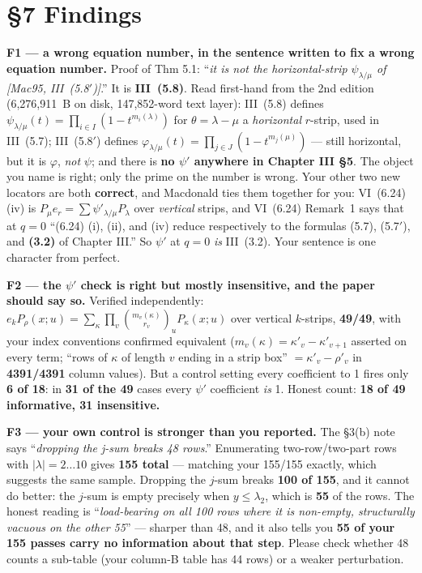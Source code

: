 \documentclass[11pt]{article}
\begin{document}
\section*{\S7 Findings}
\textbf{F1 --- a wrong equation number, in the sentence written to fix a wrong equation
number.} Proof of Thm 5.1: ``\emph{it is not the horizontal-strip $\psi_{\lambda/\mu}$ of
[Mac95, III~(5.8$'$)]}.'' It is \textbf{III~(5.8)}. Read first-hand from the 2nd edition
(6{,}276{,}911~B on disk, 147{,}852-word text layer): III~(5.8) defines
$\psi_{\lambda/\mu}(t)=\prod_{i\in I}(1-t^{m_i(\lambda)})$ for $\theta=\lambda-\mu$ a
\emph{horizontal} $r$-strip, used in III~(5.7); III~(5.8$'$) defines
$\varphi_{\lambda/\mu}(t)=\prod_{j\in J}(1-t^{m_j(\mu)})$ --- still horizontal, but it is
$\varphi$, \emph{not} $\psi$; and there is \textbf{no $\psi'$ anywhere in Chapter III
\S5}. The object you name is right; only the prime on the number is wrong. Your other
two new locators are both \textbf{correct}, and Macdonald ties them together for you:
VI~(6.24)(iv) is $P_\mu e_r=\sum\psi'_{\lambda/\mu}P_\lambda$ over \emph{vertical}
strips, and VI~(6.24) Remark~1 says that at $q=0$ ``(6.24) (i), (ii), and (iv) reduce
respectively to the formulas (5.7), (5.7$'$), and \textbf{(3.2)} of Chapter III.'' So
$\psi'$ at $q=0$ \emph{is} III~(3.2). Your sentence is one character from perfect.

\textbf{F2 --- the $\psi'$ check is right but mostly insensitive, and the paper should
say so.} Verified independently: $e_kP_\rho(x;u)=\sum_\kappa\prod_v\binom{m_v(\kappa)}{r_v}_u
P_\kappa(x;u)$ over vertical $k$-strips, \textbf{49/49}, with your index conventions
confirmed equivalent ($m_v(\kappa)=\kappa'_v-\kappa'_{v+1}$ asserted on every term;
``rows of $\kappa$ of length $v$ ending in a strip box'' $=\kappa'_v-\rho'_v$ in
\textbf{4391/4391} column values). But a control setting every coefficient to 1 fires
only \textbf{6 of 18}: in \textbf{31 of the 49} cases every $\psi'$ coefficient
\emph{is} 1. Honest count: \textbf{18 of 49 informative, 31 insensitive.}

\textbf{F3 --- your own control is stronger than you reported.} The \S3(b) note says
``\emph{dropping the j-sum breaks 48 rows}.'' Enumerating two-row/two-part rows with
$|\lambda|=2\ldots10$ gives \textbf{155 total} --- matching your 155/155 exactly, which
suggests the same sample. Dropping the $j$-sum breaks \textbf{100 of 155}, and it cannot
do better: the $j$-sum is empty precisely when $y\le\lambda_2$, which is \textbf{55} of
the rows. The honest reading is ``\emph{load-bearing on all 100 rows where it is
non-empty, structurally vacuous on the other 55}'' --- sharper than 48, and it also tells
you \textbf{55 of your 155 passes carry no information about that step}. Please check
whether 48 counts a sub-table (your column-B table has 44 rows) or a weaker
perturbation.
\end{document}
